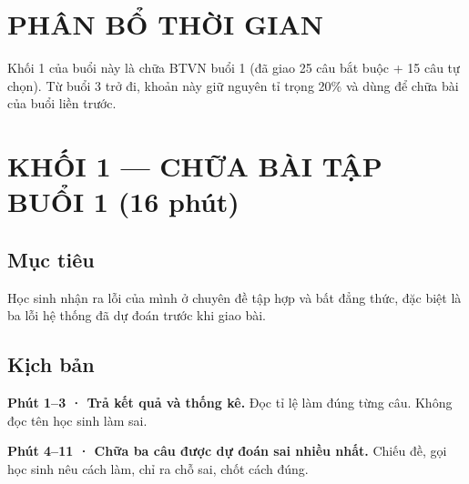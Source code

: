 \documentclass[11pt, a4paper]{article}
\begin{document}

\section{PHÂN BỔ THỜI GIAN}


Khối 1 của buổi này là chữa BTVN buổi 1 (đã giao 25 câu bắt buộc + 15 câu tự chọn). Từ buổi 3 trở đi, khoản này giữ nguyên tỉ trọng 20\% và dùng để chữa bài của buổi liền trước.

\section{KHỐI 1 — CHỮA BÀI TẬP BUỔI 1 (16 phút)}

\subsection{Mục tiêu}

Học sinh nhận ra lỗi của mình ở chuyên đề tập hợp và bất đẳng thức, đặc biệt là ba lỗi hệ thống đã dự đoán trước khi giao bài.

\subsection{Kịch bản}

\textbf{Phút 1–3 · Trả kết quả và thống kê.} Đọc tỉ lệ làm đúng từng câu. Không đọc tên học sinh làm sai.

\textbf{Phút 4–11 · Chữa ba câu được dự đoán sai nhiều nhất.} Chiếu đề, gọi học sinh nêu cách làm, chỉ ra chỗ sai, chốt cách đúng.

\end{document}
